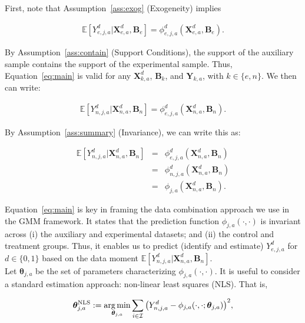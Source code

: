 \noindent First, note that Assumption~\ref{ass:exog} (Exogeneity) implies

\begin{eqnarray}
\mathbb{E} \left[ Y_{e,j,a}^d | \bm{X}_{e,a}^d, \bm{B}_{e} \right] =  \phi^d_{e,j,a}\left( \bm{X}_{e,a}^d, \bm{B}_{e} \right). \label{eq:main}
\end{eqnarray}

\noindent By Assumption~\ref{ass:contain} (Support Conditions), the support of the auxiliary sample contains the support of the experimental sample. Thus, Equation~\eqref{eq:main} is valid for any $\bm{X}^d_{k,a}$, $\bm{B}_{k}$, and $\bm{Y}_{k,a}$, with $k \in \{ e, n\}$. We then can write: 

\begin{eqnarray}
\mathbb{E} \left[ Y_{n,j,a}^d | \bm{X}_{n,a}^d, \bm{B}_{n} \right] =  \phi^d_{e,j,a}\left( \bm{X}_{n,a}^d, \bm{B}_{n} \right).
\end{eqnarray}

\noindent By Assumption~\ref{ass:summary} (Invariance), we can write this as: 

\begin{eqnarray}
\mathbb{E} \left[ Y_{n,j,a}^d | \bm{X}_{n,a}^d, \bm{B}_{n} \right] &=&  \phi^d_{e,j,a}\left( \bm{X}_{n,a}^d, \bm{B}_{n} \right) \nonumber \\ 
 &=&  \phi^d_{n,j,a}\left( \bm{X}_{n,a}^d, \bm{B}_{n} \right) \nonumber \\
 &=&  \phi_{j,a}\left( \bm{X}_{n,a}^d, \bm{B}_{n} \right). \label{eq:mainpred}
\end{eqnarray}

\noindent Equation~\eqref{eq:main} is key in framing the data combination approach we use in the GMM framework. It states that the prediction function $\phi_{j,a} \left( \cdot, \cdot \right) $ is invariant across (i) the auxiliary and experimental datasets; and (ii) the control and treatment groups. Thus, it enables us to predict (identify and estimate) $Y_{e,j,a}^d$ for $d \in \{0, 1\}$ based on the data moment $\mathbb{E} \left[ Y_{n,j,a}^d | \bm{X}_{n,a}^d, \bm{B}_{n} \right] $.\\

\noindent Let $\bm{\theta}_{j,a}$ be the set of parameters characterizing $\phi_{j,a}\left( \cdot, \cdot \right)$. It is useful to consider a standard estimation approach: non-linear least squares (NLS). That is, 

\begin{equation}
 \bm{\theta}_{j,a}^{\text{NLS}} := \operatorname*{arg\,min}_{\bm{\theta}_{j,a}} \sum \limits _{i \in \mathcal{I}} {\left( Y^d_{n,j,a}  - \phi_{j,a} (\cdot , \cdot; \bm{\theta}_{j,a} )\right)}^2, 
\end{equation}

